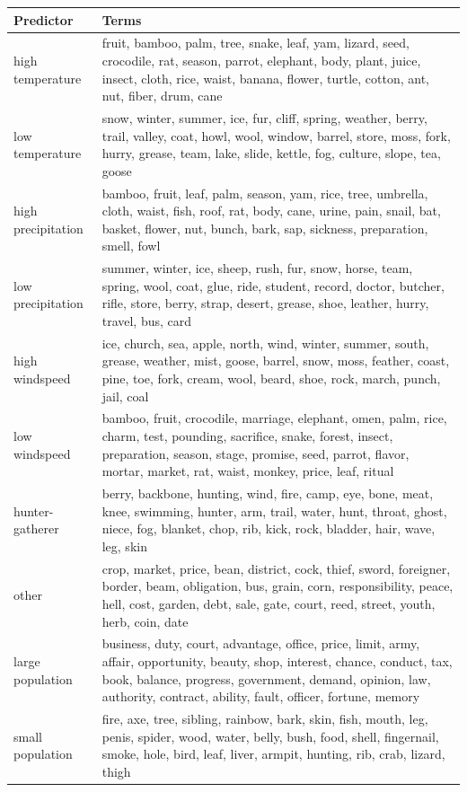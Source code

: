 \begin{table}[ht]
\centering
\begin{tabular}{ll}
  \hline
Predictor & Terms \\ 
  \hline
high temperature & fruit, bamboo, palm, tree, snake, leaf, yam, lizard, seed, crocodile, rat, season, parrot, elephant, body, plant, juice, insect, cloth, rice, waist, banana, flower, turtle, cotton, ant, nut, fiber, drum, cane \\ 
  low temperature & snow, winter, summer, ice, fur, cliff, spring, weather, berry, trail, valley, coat, howl, wool, window, barrel, store, moss, fork, hurry, grease, team, lake, slide, kettle, fog, culture, slope, tea, goose \\ 
  high precipitation & bamboo, fruit, leaf, palm, season, yam, rice, tree, umbrella, cloth, waist, fish, roof, rat, body, cane, urine, pain, snail, bat, basket, flower, nut, bunch, bark, sap, sickness, preparation, smell, fowl \\ 
  low precipitation & summer, winter, ice, sheep, rush, fur, snow, horse, team, spring, wool, coat, glue, ride, student, record, doctor, butcher, rifle, store, berry, strap, desert, grease, shoe, leather, hurry, travel, bus, card \\ 
  high windspeed & ice, church, sea, apple, north, wind, winter, summer, south, grease, weather, mist, goose, barrel, snow, moss, feather, coast, pine, toe, fork, cream, wool, beard, shoe, rock, march, punch, jail, coal \\ 
  low windspeed & bamboo, fruit, crocodile, marriage, elephant, omen, palm, rice, charm, test, pounding, sacrifice, snake, forest, insect, preparation, season, stage, promise, seed, parrot, flavor, mortar, market, rat, waist, monkey, price, leaf, ritual \\ 
  hunter-gatherer & berry, backbone, hunting, wind, fire, camp, eye, bone, meat, knee, swimming, hunter, arm, trail, water, hunt, throat, ghost, niece, fog, blanket, chop, rib, kick, rock, bladder, hair, wave, leg, skin \\ 
  other & crop, market, price, bean, district, cock, thief, sword, foreigner, border, beam, obligation, bus, grain, corn, responsibility, peace, hell, cost, garden, debt, sale, gate, court, reed, street, youth, herb, coin, date \\ 
  large population & business, duty, court, advantage, office, price, limit, army, affair, opportunity, beauty, shop, interest, chance, conduct, tax, book, balance, progress, government, demand, opinion, law, authority, contract, ability, fault, officer, fortune, memory \\ 
  small population & fire, axe, tree, sibling, rainbow, bark, skin, fish, mouth, leg, penis, spider, wood, water, belly, bush, food, shell, fingernail, smoke, hole, bird, leaf, liver, armpit, hunting, rib, crab, lizard, thigh \\ 
   \hline
\end{tabular}
\end{table}

